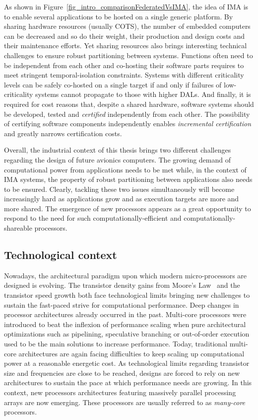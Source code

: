 \documentclass[main.tex]{subfiles}
\begin{document}
As shown in Figure~\ref{fig_intro_comparisonFederatedVsIMA}, the idea of IMA is to enable several applications to be hosted on a single generic platform. By sharing hardware resources (usually COTS), the number of embedded computers can be decreased and so do their weight, their production and design costs and their maintenance efforts. Yet sharing resources also brings interesting technical challenges to ensure robust partitioning between systems. Functions often need to be independent from each other and co-hosting their software parts requires to meet stringent temporal-isolation constraints. Systems with different criticality levels can be safely co-hosted on a single target if and only if failures of low-criticality systems cannot propagate to those with higher DALs. And finally, it is required for cost reasons that, despite a shared hardware, software systems should be developed, tested and \emph{certified} independently from each other. The possibility of certifying software components independently enables \emph{incremental certification} and greatly narrows certification costs.

Overall, the industrial context of this thesis brings two different challenges regarding the design of future avionics computers. The growing demand of computational power from applications needs to be met while, in the context of IMA systems, the property of robust partitioning between applications also needs to be ensured. Clearly, tackling these two issues simultaneously will become increasingly hard as applications grow and as execution targets are more and more shared. The emergence of new processors appears as a great opportunity to respond to the need for such computationally-efficient and computationally-shareable processors.




\subsection{Technological context}
Nowadays, the architectural paradigm upon which modern micro-processors are designed is evolving. The transistor density gains from Moore's Law~\cite{Moore1975} and the transistor speed growth both face technological limits bringing new challenges to sustain the fast-paced strive for computational performance. Deep changes in processor architectures already occurred in the past. Multi-core processors were introduced to beat the inflexion of performance scaling when pure architectural optimizations such as pipelining, speculative branching or out-of-order execution used to be the main solutions to increase performance.
Today, traditional multi-core architectures are again facing difficulties to keep scaling up computational power at a reasonable energetic cost. As technological limits regarding transistor size and frequencies are close to be reached, designs are forced to rely on new architectures to sustain the pace at which performance needs are growing. In this context, new processors architectures featuring massively parallel processing arrays are now emerging. These processors are usually referred to as \emph{many-core} processors.
\end{document}
